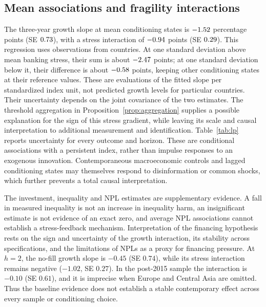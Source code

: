\subsection{Mean associations and fragility interactions}\label{subsec:lp}

The three-year growth slope at mean conditioning states is $-1.52$
percentage points (SE $0.73$), with a stress interaction of
$-0.94$ points (SE $0.29$). This regression uses
\GrowthTwoN{} observations from \GrowthTwoCountries{} countries.
At one standard deviation above mean banking stress, their sum is about
$-2.47$ points; at one standard deviation below it, their difference is
about $-0.58$ points, keeping other conditioning states at their reference
values. These are evaluations of the fitted slope per standardized index
unit, not predicted growth levels for particular countries. Their uncertainty
depends on the joint covariance of the two estimates. The threshold
aggregation in Proposition~\ref{prop:aggregation} supplies a possible
explanation for the sign of this stress gradient, while leaving its scale
and causal interpretation to additional measurement and identification.
Table~\ref{tab:lp} reports uncertainty for every outcome and horizon. These
are conditional associations with a persistent index, rather than impulse
responses to an exogenous innovation. Contemporaneous macroeconomic controls
and lagged conditioning states may themselves respond to disinformation or common
shocks, which further prevents a total causal interpretation.

The investment, inequality and NPL estimates are supplementary evidence.
A fall in measured inequality is not an increase in inequality harm, an
insignificant estimate is not evidence of an exact zero, and average NPL
associations cannot establish a stress-feedback mechanism. Interpretation of
the financing hypothesis rests on the sign and uncertainty of the growth
interaction, its stability across specifications, and the limitations of NPLs
as a proxy for financing pressure. At $h=2$, the no-fill growth slope is
$-0.45$ (SE $0.74$), while its stress interaction remains negative
($-1.02$, SE $0.27$). In the post-2015 sample the interaction is $-0.10$
(SE $0.61$), and it is imprecise when Europe and Central Asia are omitted.
Thus the baseline evidence does not establish a stable contemporary effect
across every sample or conditioning choice.

